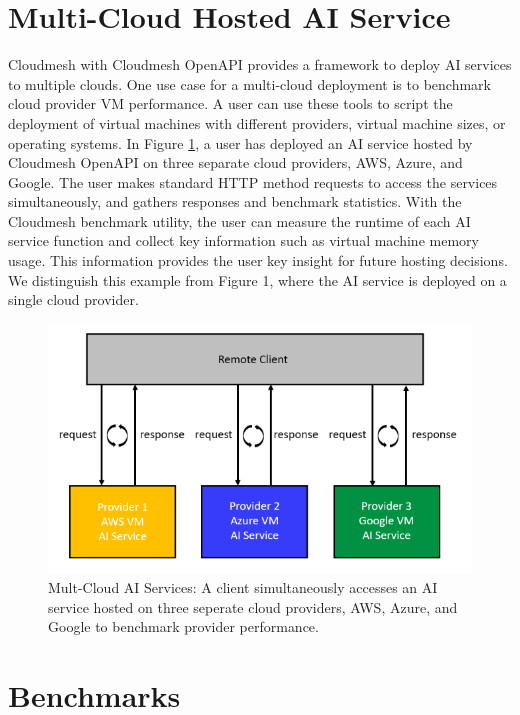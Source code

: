 \section{Multi-Cloud Hosted AI
Service}\label{multi-cloud-hosted-ai-service}

Cloudmesh with Cloudmesh OpenAPI provides a framework to deploy AI
services to multiple clouds. One use case for a multi-cloud deployment
is to benchmark cloud provider VM performance. A user can use these
tools to script the deployment of virtual machines with different
providers, virtual machine sizes, or operating systems. In Figure \ref{fig:2}, a
user has deployed an AI service hosted by Cloudmesh OpenAPI on three
separate cloud providers, AWS, Azure, and Google. The user makes
standard HTTP method requests to access the services simultaneously, and
gathers responses and benchmark statistics. With the Cloudmesh benchmark
utility, the user can measure the runtime of each AI service function
and collect key information such as virtual machine memory usage. This
information provides the user key insight for future hosting decisions.
We distinguish this example from Figure 1, where the AI service is
deployed on a single cloud provider.

\begin{figure}
\centering
\includegraphics[width=\columnwidth]{../images/multi-cloud-ai-service.png}
\caption{Mult-Cloud AI Services: A client simultaneously accesses an AI service hosted
on three seperate cloud providers, AWS, Azure, and Google to benchmark
provider performance.}
\label{fig:2}
\end{figure}

\section{Benchmarks}\label{benchmarks}

